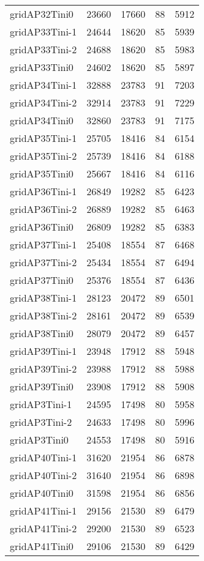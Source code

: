 \begin{tabular}{lrrrr}
gridAP32Tini0 & 23660 & 17660 & 88 & 5912 \\
gridAP33Tini-1 & 24644 & 18620 & 85 & 5939 \\
gridAP33Tini-2 & 24688 & 18620 & 85 & 5983 \\
gridAP33Tini0 & 24602 & 18620 & 85 & 5897 \\
gridAP34Tini-1 & 32888 & 23783 & 91 & 7203 \\
gridAP34Tini-2 & 32914 & 23783 & 91 & 7229 \\
gridAP34Tini0 & 32860 & 23783 & 91 & 7175 \\
gridAP35Tini-1 & 25705 & 18416 & 84 & 6154 \\
gridAP35Tini-2 & 25739 & 18416 & 84 & 6188 \\
gridAP35Tini0 & 25667 & 18416 & 84 & 6116 \\
gridAP36Tini-1 & 26849 & 19282 & 85 & 6423 \\
gridAP36Tini-2 & 26889 & 19282 & 85 & 6463 \\
gridAP36Tini0 & 26809 & 19282 & 85 & 6383 \\
gridAP37Tini-1 & 25408 & 18554 & 87 & 6468 \\
gridAP37Tini-2 & 25434 & 18554 & 87 & 6494 \\
gridAP37Tini0 & 25376 & 18554 & 87 & 6436 \\
gridAP38Tini-1 & 28123 & 20472 & 89 & 6501 \\
gridAP38Tini-2 & 28161 & 20472 & 89 & 6539 \\
gridAP38Tini0 & 28079 & 20472 & 89 & 6457 \\
gridAP39Tini-1 & 23948 & 17912 & 88 & 5948 \\
gridAP39Tini-2 & 23988 & 17912 & 88 & 5988 \\
gridAP39Tini0 & 23908 & 17912 & 88 & 5908 \\
gridAP3Tini-1 & 24595 & 17498 & 80 & 5958 \\
gridAP3Tini-2 & 24633 & 17498 & 80 & 5996 \\
gridAP3Tini0 & 24553 & 17498 & 80 & 5916 \\
gridAP40Tini-1 & 31620 & 21954 & 86 & 6878 \\
gridAP40Tini-2 & 31640 & 21954 & 86 & 6898 \\
gridAP40Tini0 & 31598 & 21954 & 86 & 6856 \\
gridAP41Tini-1 & 29156 & 21530 & 89 & 6479 \\
gridAP41Tini-2 & 29200 & 21530 & 89 & 6523 \\
gridAP41Tini0 & 29106 & 21530 & 89 & 6429 \\

\end{tabular}
